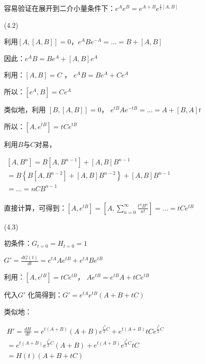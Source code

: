 容易验证在展开到二介小量条件下：$e^A e^B  = e^{A + B} e^{\frac{1}{2}\left[ {A,B} \right]} $

(4.2)

利用$\left[ {A,\left[ {A,B} \right]} \right] = 0$，$e^A Be^{ - A}  = ... = B + \left[ {A,B} \right]$



因此：$e^A B = Be^A  + \left[ {A,B} \right]e^A $


利用：$\left[ {A,B} \right] = C$ ， $e^A B = Be^A  + Ce^A $



所以：$\left[ {e^A ,B} \right] = Ce^A $


类似地，利用 $\left[ {B,\left[ {A,B} \right]} \right] = 0$，
$e^{tB} Ae^{ - tB}  = ... = A + \left[ {B,A} \right]t$


所以：$\left[ {A,e^{tB} } \right] = tCe^{tB} $



利用$B$与$C$对易，

$\begin{array}{l}
 \left[ {A,B^n } \right] = B\left[ {A,B^{n - 1} } \right] + \left[ {A,B} \right]B^{n - 1}  \\
  = B\left\{ {B\left[ {A,B^{n - 2} } \right] + \left[ {A,B} \right]B^{n - 2} } \right\} + \left[ {A,B} \right]B^{n - 1}  \\
  = ... = nCB^{n - 1}  \\
 \end{array}$


直接计算，可得到：$\left[ {A,e^{tB} } \right] = \left[ {A,\sum\limits_{n = 0}^\infty  {\frac{{t^n B^n }}{{n!}}} } \right] = ... = tCe^{tB} $


(4.3)

初条件：$G_{t = 0}  = H_{t = 0}  = 1$

$G' = \frac{{dG(t)}}{{dt}} = e^{tA} Ae^{tB}  + e^{tA} Be^{tB} $


利用：$\left[ {A,e^{tB} } \right] = tCe^{tB} $，
$Ae^{tB}  = e^{tB} A + tCe^{tB} $


代入$G'$ 化简得到：$G' = e^{tA} e^{tB} \left( {A + B + tC} \right)$


类似地：

$\begin{array}{l}
 H' = \frac{{dH}}{{dt}} = e^{t\left( {A + B} \right)} \left( {A + B} \right)e^{\frac{{t^2 }}{2}C}  + e^{t\left( {A + B} \right)} tCe^{\frac{{t^2 }}{2}C}  \\
  = e^{t\left( {A + B} \right)} e^{\frac{{t^2 }}{2}C} \left( {A + B} \right) + e^{t\left( {A + B} \right)} e^{\frac{{t^2 }}{2}C} tC \\
  = H\left( t \right)\left( {A + B + tC} \right) \\
 \end{array}$


